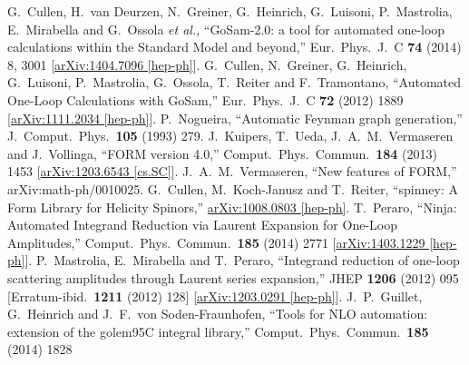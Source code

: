 \documentclass[a4paper]{article}
\begin{document}
\begin{thebibliography}{ABC}
  G.~Cullen, H.~van Deurzen, N.~Greiner, G.~Heinrich, G.~Luisoni, P.~Mastrolia, E.~Mirabella and G.~Ossola {\it et al.},
  ``GoSam-2.0: a tool for automated one-loop calculations within the Standard Model and beyond,''
  Eur.\ Phys.\ J.\ C {\bf 74} (2014) 8,  3001
  [\href{http://arxiv.org/abs/1404.7096}{arXiv:1404.7096 [hep-ph]}].
  G.~Cullen, N.~Greiner, G.~Heinrich, G.~Luisoni, P.~Mastrolia, G.~Ossola, T.~Reiter and F.~Tramontano,
  ``Automated One-Loop Calculations with GoSam,''
  Eur.\ Phys.\ J.\ C {\bf 72} (2012) 1889
  [\href{http://arxiv.org/abs/1111.2034}{arXiv:1111.2034 [hep-ph]}].
  P.~Nogueira,
  ``Automatic Feynman graph generation,''
  J.\ Comput.\ Phys.\  {\bf 105} (1993) 279.
  J.~Kuipers, T.~Ueda, J.~A.~M.~Vermaseren and J.~Vollinga,
  ``FORM version 4.0,''
  Comput.\ Phys.\ Commun.\  {\bf 184} (2013) 1453
  [\href{http://arxiv.org/abs/1203.6543}{arXiv:1203.6543 [cs.SC]}].
  J.~A.~M.~Vermaseren,
  ``New features of FORM,''
  arXiv:math-ph/0010025.
  G.~Cullen, M.~Koch-Janusz and T.~Reiter,
  ``spinney: A Form Library for Helicity Spinors,''
  \href{http://arxiv.org/abs/1008.0803}{arXiv:1008.0803 [hep-ph]}.
  T.~Peraro,
  ``Ninja: Automated Integrand Reduction via Laurent Expansion for One-Loop Amplitudes,''
  Comput.\ Phys.\ Commun.\  {\bf 185} (2014) 2771
  [\href{http://arxiv.org/abs/1403.1229}{arXiv:1403.1229 [hep-ph]}].
  P.~Mastrolia, E.~Mirabella and T.~Peraro,
  ``Integrand reduction of one-loop scattering amplitudes through Laurent series expansion,''
  JHEP {\bf 1206} (2012) 095
   [Erratum-ibid.\  {\bf 1211} (2012) 128]
  [\href{http://arxiv.org/abs/1203.0291}{arXiv:1203.0291 [hep-ph]}].
  J.~P.~Guillet, G.~Heinrich and J.~F.~von Soden-Fraunhofen,
  ``Tools for NLO automation: extension of the golem95C integral library,''
  Comput.\ Phys.\ Commun.\  {\bf 185} (2014) 1828

\end{thebibliography}
\end{document}

